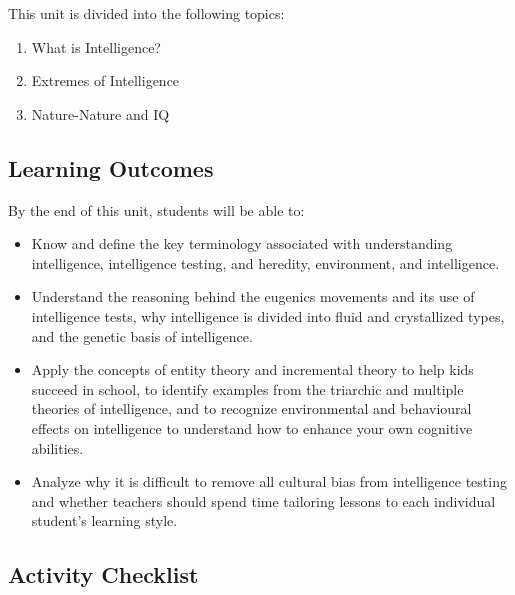 \documentclass[
]{book}
\providecommand{\tightlist}{%
  \setlength{\itemsep}{0pt}\setlength{\parskip}{0pt}}
\begin{document}
This unit is divided into the following topics:

\begin{enumerate}
\def\labelenumi{\arabic{enumi}.}
\tightlist
\item
  What is Intelligence?\\
\item
  Extremes of Intelligence\\
\item
  Nature-Nature and IQ
\end{enumerate}

\hypertarget{learning-outcomes-1}{%
\subsection*{Learning Outcomes}\label{learning-outcomes-1}}

By the end of this unit, students will be able to:

\begin{itemize}
\tightlist
\item
  Know and define the key terminology associated with understanding intelligence, intelligence testing, and heredity, environment, and intelligence.\\
\item
  Understand the reasoning behind the eugenics movements and its use of intelligence tests, why intelligence is divided into fluid and crystallized types, and the genetic basis of intelligence.\\
\item
  Apply the concepts of entity theory and incremental theory to help kids succeed in school, to identify examples from the triarchic and multiple theories of intelligence, and to recognize environmental and behavioural effects on intelligence to understand how to enhance your own cognitive abilities.\\
\item
  Analyze why it is difficult to remove all cultural bias from intelligence testing and whether teachers should spend time tailoring lessons to each individual student's learning style.
\end{itemize}

\hypertarget{activity-checklist-1}{%
\subsection*{Activity Checklist}\label{activity-checklist-1}}
\end{document}
